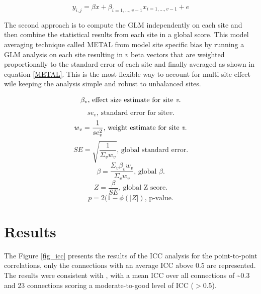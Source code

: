 \begin{equation}
    y_{i,j} = \beta x+\beta_{i=1,\dots,v-1}x_{i=1,\dots,v-1}+e
    \label{dummy variable equation}
\end{equation}

The second approach is to compute the GLM independently on each site and then combine the statistical results from each site in a global score. This model averaging technique called METAL from \cite{Willer2010} model site specific bias by running a GLM analysis on each site resulting in $v$ beta vectors that are weighted proportionally to the standard error of each site and finally averaged as shown in equation \ref{METAL}. This is the most flexible way to account for multi-site effect wile keeping the analysis simple and robust to unbalanced sites.


\begin{equation}
	\beta_{v} \text{, effect size estimate for site \textit{v}.}
\end{equation}
\begin{equation}
	se_{v} \text{, standard error for site}\textit{v}.
\end{equation}
\begin{equation}
 	w_{v}=\frac{1}{se_{v}^{2}} \text{, weight estimate for site \textit{v}.}
 \end{equation}
 \begin{equation}
 	SE=\sqrt{\frac{1}{\Sigma_{v}w_{v}}} \text{, global standard error.}
 \end{equation}
 \begin{equation}
 	\beta=\frac{\Sigma_{v}\beta_{v}w_{v}}{\Sigma_{v}w_{v}} \text{, global }\beta.
 \end{equation}
\begin{equation}\label{METAL}
	Z=\frac{\beta}{SE} \text{, global Z score.}
\end{equation}
\begin{equation}
	p=2(1-\phi(\vert Z \vert) \text{, p-value.}
\end{equation}

\section{Results}

The Figure \ref{fig_icc} presents the results of the ICC analysis for the point-to-point correlations, 
only the connections with an average ICC above 0.5 are represented. The results were consistent with \citep{Shehzad2009}, with a mean ICC over all connections of \textasciitilde0.3 and 23 connections scoring a moderate-to-good level of ICC ($>0.5$). 

